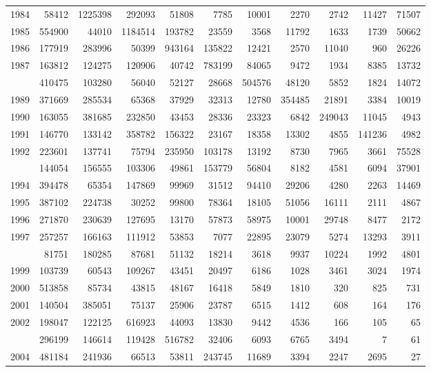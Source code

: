 \documentclass[
]{article}
\begin{document}
\begin{longtable}[t]{lrrrrrrrrrr}
1984 & 58412 & 1225398 & 292093 & 51808 & 7785 & 10001 & 2270 & 2742 & 11427 & 71507\\
1985 & 554900 & 44010 & 1184514 & 193782 & 23559 & 3568 & 11792 & 1633 & 1739 & 50662\\
1986 & 177919 & 283996 & 50399 & 943164 & 135822 & 12421 & 2570 & 11040 & 960 & 26226\\
1987 & 163812 & 124275 & 120906 & 40742 & 783199 & 84065 & 9472 & 1934 & 8385 & 13732\\
\addlinespace
1988 & 410475 & 103280 & 56040 & 52127 & 28668 & 504576 & 48120 & 5852 & 1824 & 14072\\
1989 & 371669 & 285534 & 65368 & 37929 & 32313 & 12780 & 354485 & 21891 & 3384 & 10019\\
1990 & 163055 & 381685 & 232850 & 43453 & 28336 & 23323 & 6842 & 249043 & 11045 & 4943\\
1991 & 146770 & 133142 & 358782 & 156322 & 23167 & 18358 & 13302 & 4855 & 141236 & 4982\\
1992 & 223601 & 137741 & 75794 & 235950 & 103178 & 13192 & 8730 & 7965 & 3661 & 75528\\
\addlinespace
1993 & 144054 & 156555 & 103306 & 49861 & 153779 & 56804 & 8182 & 4581 & 6094 & 37901\\
1994 & 394478 & 65354 & 147869 & 99969 & 31512 & 94410 & 29206 & 4280 & 2263 & 14469\\
1995 & 387102 & 224738 & 30252 & 99800 & 78364 & 18105 & 51056 & 16111 & 2111 & 4867\\
1996 & 271870 & 230639 & 127695 & 13170 & 57873 & 58975 & 10001 & 29748 & 8477 & 2172\\
1997 & 257257 & 166163 & 111912 & 53853 & 7077 & 22895 & 23079 & 5274 & 13293 & 3911\\
\addlinespace
1998 & 81751 & 180285 & 87681 & 51132 & 18214 & 3618 & 9937 & 10224 & 1992 & 4801\\
1999 & 103739 & 60543 & 109267 & 43451 & 20497 & 6186 & 1028 & 3461 & 3024 & 1974\\
2000 & 513858 & 85734 & 43815 & 48167 & 16418 & 5849 & 1810 & 320 & 825 & 731\\
2001 & 140504 & 385051 & 75137 & 25906 & 23787 & 6515 & 1412 & 608 & 164 & 176\\
2002 & 198047 & 122125 & 616923 & 44093 & 13830 & 9442 & 4536 & 166 & 105 & 65\\
\addlinespace
2003 & 296199 & 146614 & 119428 & 516782 & 32406 & 6093 & 6765 & 3494 & 7 & 61\\
2004 & 481184 & 241936 & 66513 & 53811 & 243745 & 11689 & 3394 & 2247 & 2695 & 27\\

\end{longtable}
\end{document}
